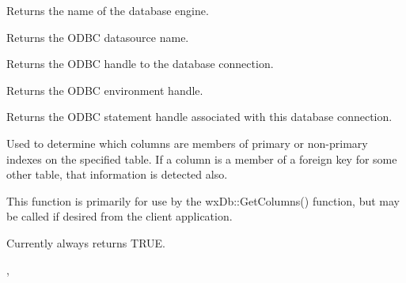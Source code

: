 Returns the name of the database engine.


\label{wxdbgetdatasource}


Returns the ODBC datasource name.


\label{wxdbgethdbc}


Returns the ODBC handle to the database connection.


\label{wxdbgethenv}


Returns the ODBC environment handle.


\label{wxdbgethstmt}


Returns the ODBC statement handle associated with this database connection.


\label{wxdbgetkeyfields}


Used to determine which columns are members of primary or non-primary indexes on the specified table.  If a column is a member of a foreign key for some other table, that information is detected also.

This function is primarily for use by the wxDb::GetColumns() function, but may be called if desired from the client application.




Currently always returns TRUE.


, 


\label{wxdbgetnext}

